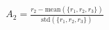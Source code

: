 \documentclass[preview]{standalone}
\begin{document}
\begin{align*}
A_2 = \frac{r_2 - \text{mean}\left(\{r_1, r_2, r_3\}\right)}{\text{std}\left(\{r_1, r_2, r_3\}\right)}
\end{align*}
\end{document}
